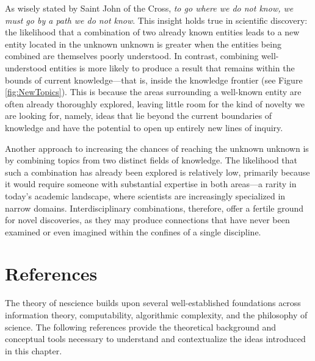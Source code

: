 

As wisely stated by Saint John of the Cross, \emph{to go where we do not know, we must go by a path we do not know}. This insight holds true in scientific discovery: the likelihood that a combination of two already known entities leads to a new entity located in the unknown unknown is greater when the entities being combined are themselves poorly understood. In contrast, combining well-understood entities is more likely to produce a result that remains within the bounds of current knowledge—that is, inside the knowledge frontier (see Figure \ref{fig:NewTopics}). This is because the areas surrounding a well-known entity are often already thoroughly explored, leaving little room for the kind of novelty we are looking for, namely, ideas that lie beyond the current boundaries of knowledge and have the potential to open up entirely new lines of inquiry.

Another approach to increasing the chances of reaching the unknown unknown is by combining topics from two distinct fields of knowledge. The likelihood that such a combination has already been explored is relatively low, primarily because it would require someone with substantial expertise in both areas—a rarity in today's academic landscape, where scientists are increasingly specialized in narrow domains. Interdisciplinary combinations, therefore, offer a fertile ground for novel discoveries, as they may produce connections that have never been examined or even imagined within the confines of a single discipline.

%
%

\section*{References}

The theory of nescience builds upon several well-established foundations across information theory, computability, algorithmic complexity, and the philosophy of science. The following references provide the theoretical background and conceptual tools necessary to understand and contextualize the ideas introduced in this chapter.
 
